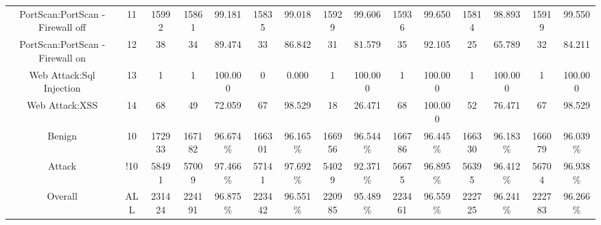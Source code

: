 \begin{table}[htb]
\begin{tabular}{@{}ccccccccccccccc@{}}
        PortScan:PortScan - Firewall off &  11 &  15992 &  15861 &  99.181 &  15835 &  99.018 &  15929 &  99.606 &  15936 &  99.650 &  15814 &  98.893 &  15919 &  99.550 \\
        PortScan:PortScan - Firewall on &  12 &  38 &  34 &  89.474 &  33 &  86.842 &  31 &  81.579 &  35 &  92.105 &  25 &  65.789 &  32 &  84.211 \\
        Web Attack:Sql Injection &  13 &  1 &  1 &  100.000 &  0 &  0.000 &  1 &  100.000 &  1 &  100.000 &  1 &  100.000 &  1 &  100.000 \\
        Web Attack:XSS &  14 &  68 &  49 &  72.059 &  67 &  98.529 &  18 &  26.471 &  68 &  100.000 &  52 &  76.471 &  67 &  98.529 \\
        Benign &  10 &  172933 &  167182 &  96.674\% &  166301 &  96.165\% &  166956 &  96.544\% &  166786 &  96.445\% &  166330 &  96.183\% &  166079 &  96.039\% \\
        Attack &  !10 &  58491 &  57009 &  97.466\% &  57141 &  97.692\% &  54029 &  92.371\% &  56675 &  96.895\% &  56395 &  96.412\% &  56704 &  96.938\% \\
        Overall &  ALL &  231424 &  224191 &  96.875\% &  223442 &  96.551\% &  220985 &  95.489\% &  223461 &  96.559\% &  222725 &  96.241\% &  222783 &  96.266\% \\
        \bottomrule
    \end{tabular}
\end{table}
